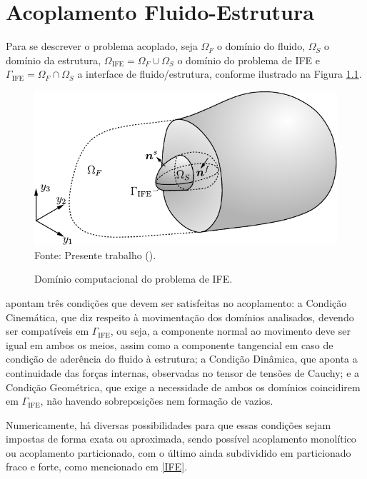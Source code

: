 \chapter{Acoplamento Fluido-Estrutura} \label{AFE}

Para se descrever o problema acoplado, seja $\Omega_F$ o domínio do fluido, $\Omega_S$ o domínio da estrutura, $\Omega_\mathrm{IFE}=\Omega_F\cup\Omega_S$ o domínio do problema de IFE e $\Gamma_\mathrm{IFE}=\Omega_F\cap\Omega_S$ a interface de fluido/estrutura, conforme ilustrado na Figura \ref{fig:DomComp}.

\begin{figure}[h!]
    \centering
    \caption{Domínio computacional do problema de IFE.}
    \includegraphics[width=.65\linewidth]{Figuras/Dom_Comp.pdf}
    \\Fonte: Presente trabalho (\the\year).
    \label{fig:DomComp}
\end{figure}

 apontam três condições que devem ser satisfeitas no acoplamento: a Condição Cinemática, que diz respeito à movimentação dos domínios analisados, devendo ser compatíveis em $\Gamma_\mathrm{IFE}$, ou seja, a componente normal ao movimento deve ser igual em ambos os meios, assim como a componente tangencial em caso de condição de aderência do fluido à estrutura; a Condição Dinâmica, que aponta a continuidade das forças internas, observadas no tensor de tensões de Cauchy; e a Condição Geométrica, que exige a necessidade de ambos os domínios coincidirem em $\Gamma_\mathrm{IFE}$, não havendo sobreposições nem formação de vazios.

Numericamente, há diversas possibilidades para que essas condições sejam impostas de forma exata ou aproximada, sendo possível acoplamento monolítico ou acoplamento particionado, com o último ainda subdividido em particionado fraco e forte, como mencionado em \ref{IFE}.

